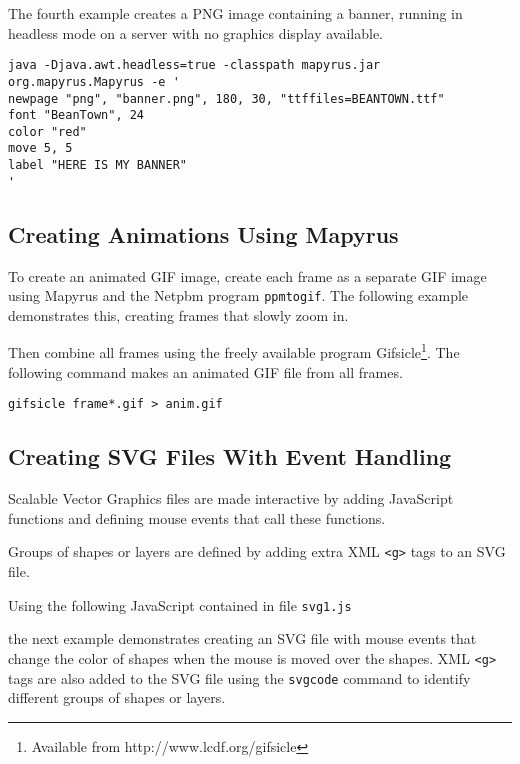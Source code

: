 The fourth example creates a PNG image containing a banner,
running in headless mode on a server with no graphics display available.

\begin{verbatim}
java -Djava.awt.headless=true -classpath mapyrus.jar org.mapyrus.Mapyrus -e '
newpage "png", "banner.png", 180, 30, "ttffiles=BEANTOWN.ttf"
font "BeanTown", 24
color "red"
move 5, 5
label "HERE IS MY BANNER"
'
\end{verbatim}

\subsection{Creating Animations Using Mapyrus}

To create an animated GIF image, create each frame as a separate
GIF image using Mapyrus and the Netpbm program \texttt{ppmtogif}.
The following example demonstrates this, creating frames that slowly
zoom in.



Then combine all frames using the freely available program
Gifsicle\footnote{Available from http://www.lcdf.org/gifsicle}.
The following command makes an animated GIF file from all frames.

\begin{verbatim}
gifsicle frame*.gif > anim.gif
\end{verbatim}

\subsection{Creating SVG Files With Event Handling}

Scalable Vector Graphics files are made interactive by
adding JavaScript functions and defining
mouse events that call these functions.

Groups of shapes or layers are defined by adding extra
XML \texttt{<g>} tags to an SVG file.

Using the following JavaScript contained in file \texttt{svg1.js}



the next example demonstrates creating an SVG file with
mouse events that change the color of shapes when the mouse is moved over
the shapes.
XML \texttt{<g>} tags are also added to the SVG file using the \texttt{svgcode}
command to
identify different groups of shapes or layers.



